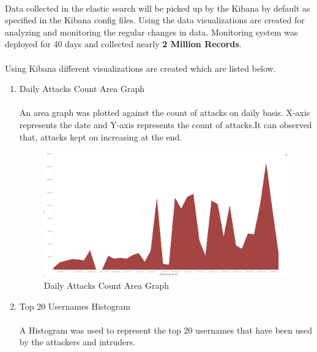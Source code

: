 \documentclass{article}
\begin{document}
\paragraph{}
Data collected in the elastic search will be picked up by the Kibana by default as specified in the Kibana config files. Using the data visualizations are created for analyzing and monitoring the regular changes in data. Monitoring system was deployed for 40 days and collected nearly \textbf{2 Million Records}.

\paragraph{}
Using Kibana different visualizations are created which are listed below.
\begin{enumerate}
\item Daily Attacks Count Area Graph
\paragraph{}
An area graph was plotted against the count of attacks on daily basis. X-axis represents the date and Y-axis represents the count of attacks.It can observed that, attacks kept on increasing at the end.

\begin{figure}[H]
\centering
\caption{Daily Attacks Count Area Graph}
\includegraphics[scale=0.2]{Daily_Attacks_Count}
\end{figure}


\item Top 20 Usernames Histogram
\paragraph{}
A Histogram was used to represent the top 20 usernames that have been used by the attackers and intruders.


\end{enumerate}
\end{document}
